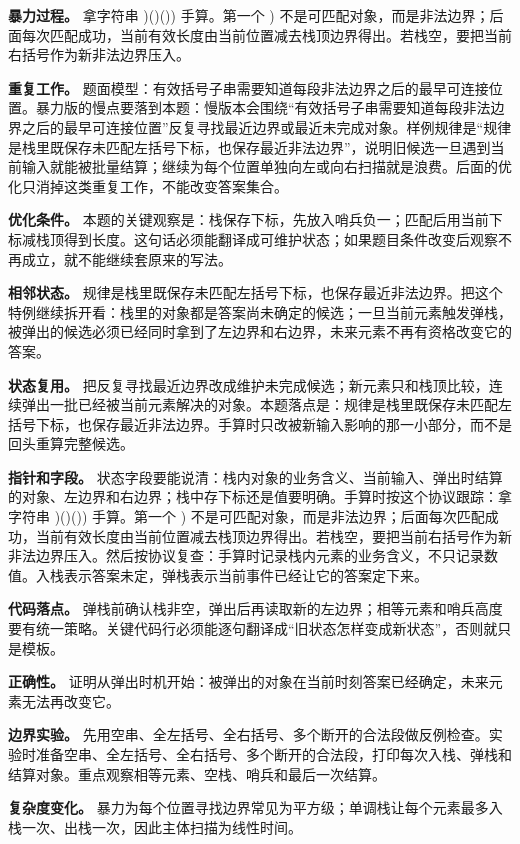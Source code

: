 \textbf{暴力过程。} 拿字符串 )()()) 手算。第一个 ) 不是可匹配对象，而是非法边界；后面每次匹配成功，当前有效长度由当前位置减去栈顶边界得出。若栈空，要把当前右括号作为新非法边界压入。

\textbf{重复工作。} 题面模型：有效括号子串需要知道每段非法边界之后的最早可连接位置。暴力版的慢点要落到本题：慢版本会围绕“有效括号子串需要知道每段非法边界之后的最早可连接位置”反复寻找最近边界或最近未完成对象。样例规律是“规律是栈里既保存未匹配左括号下标，也保存最近非法边界”，说明旧候选一旦遇到当前输入就能被批量结算；继续为每个位置单独向左或向右扫描就是浪费。后面的优化只消掉这类重复工作，不能改变答案集合。

\textbf{优化条件。} 本题的关键观察是：栈保存下标，先放入哨兵负一；匹配后用当前下标减栈顶得到长度。这句话必须能翻译成可维护状态；如果题目条件改变后观察不再成立，就不能继续套原来的写法。

\textbf{相邻状态。} 规律是栈里既保存未匹配左括号下标，也保存最近非法边界。把这个特例继续拆开看：栈里的对象都是答案尚未确定的候选；一旦当前元素触发弹栈，被弹出的候选必须已经同时拿到了左边界和右边界，未来元素不再有资格改变它的答案。

\textbf{状态复用。} 把反复寻找最近边界改成维护未完成候选；新元素只和栈顶比较，连续弹出一批已经被当前元素解决的对象。本题落点是：规律是栈里既保存未匹配左括号下标，也保存最近非法边界。手算时只改被新输入影响的那一小部分，而不是回头重算完整候选。

\textbf{指针和字段。} 状态字段要能说清：栈内对象的业务含义、当前输入、弹出时结算的对象、左边界和右边界；栈中存下标还是值要明确。手算时按这个协议跟踪：拿字符串 )()()) 手算。第一个 ) 不是可匹配对象，而是非法边界；后面每次匹配成功，当前有效长度由当前位置减去栈顶边界得出。若栈空，要把当前右括号作为新非法边界压入。然后按协议复查：手算时记录栈内元素的业务含义，不只记录数值。入栈表示答案未定，弹栈表示当前事件已经让它的答案定下来。

\textbf{代码落点。} 弹栈前确认栈非空，弹出后再读取新的左边界；相等元素和哨兵高度要有统一策略。关键代码行必须能逐句翻译成“旧状态怎样变成新状态”，否则就只是模板。

\textbf{正确性。} 证明从弹出时机开始：被弹出的对象在当前时刻答案已经确定，未来元素无法再改变它。

\textbf{边界实验。} 先用空串、全左括号、全右括号、多个断开的合法段做反例检查。实验时准备空串、全左括号、全右括号、多个断开的合法段，打印每次入栈、弹栈和结算对象。重点观察相等元素、空栈、哨兵和最后一次结算。

\textbf{复杂度变化。} 暴力为每个位置寻找边界常见为平方级；单调栈让每个元素最多入栈一次、出栈一次，因此主体扫描为线性时间。

